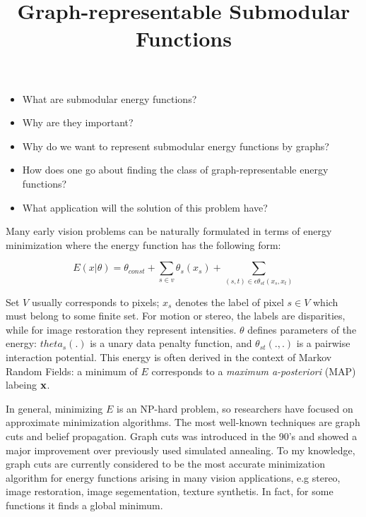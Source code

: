 \documentclass{article}
\title{Graph-representable Submodular Functions}
\begin{document}
\date{}

\maketitle
\begin{itemize}
\item What are submodular energy functions?

\item Why are they important?
\item Why do we want to represent submodular energy functions by graphs?
\item How does one go about finding the class of graph-representable energy functions?
\item What application will the solution of this problem have?
\end{itemize}

\cite{kolmogorov2006convergent}

Many early vision problems can be naturally formulated in terms of energy minimization where the energy function has the following form:

\begin{equation}
	E(x|\theta) = \theta_{const} + \sum_{s \in v} \theta_s(x_s) + \sum_{(s,t) \in \epsilon \theta_{st}(x_s, x_t)}
	\label{eq:Edef}
\end{equation}

Set $V$ usually corresponds to pixels; $x_s$ denotes the label of pixel $s \in V$ which must belong to some finite set. For motion or stereo, the labels are disparities, while for image restoration they represent intensities. $\theta$ defines parameters of the energy: $theta_s(.)$ is a unary data penalty function, and $\theta_{st}(.,.)$ is a pairwise interaction potential. This energy is often derived in the context of Markov Random Fields: a minimum of $E$ corresponds to a \emph{maximum a-posteriori} (MAP) labeing $\bf x$.

In general, minimizing $E$ is an NP-hard problem, so researchers have focused on approximate minimization algorithms. The most well-known techniques are graph cuts and belief propagation. Graph cuts was introduced in the 90's and showed a major improvement over previously used simulated annealing. To my knowledge, graph cuts are currently considered to be the most accurate minimization algorithm for energy functions arising in many vision applications, e.g stereo, image restoration, image segementation, texture synthetis. In fact, for some functions it finds a global minimum.
\end{document}
